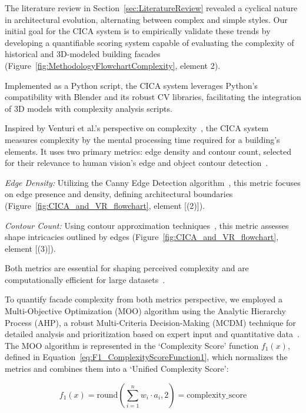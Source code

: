 
The literature review in Section~\ref{sec:LiteratureReview} revealed a cyclical nature in architectural evolution, alternating between complex and simple styles.
Our initial goal for the CICA system is to empirically validate these trends by developing a quantifiable scoring system capable of evaluating the complexity of historical and 3D-modeled building facades (Figure~\ref{fig:MethodologyFlowchartComplexity}, element 2).

Implemented as a Python script, the CICA system leverages Python's compatibility with Blender and its robust CV libraries, facilitating the integration of 3D models with complexity analysis scripts.

Inspired by Venturi et al.'s perspective on complexity~\cite{Venturi1977}, the CICA system measures complexity by the mental processing time required for a building's elements.
It uses two primary metrics: edge density and contour count, selected for their relevance to human vision's edge and object contour detection~\cite{Yang2022}.

\textit{Edge Density:} Utilizing the Canny Edge Detection algorithm~\cite{EdgeOpenCV2023}, this metric focuses on edge presence and density, defining architectural boundaries (Figure~\ref{fig:CICA_and_VR_flowchart}, element [(2)]).

\textit{Contour Count:} Using contour approximation techniques~\cite{ContourOpenCV2023}, this metric assesses shape intricacies outlined by edges (Figure~\ref{fig:CICA_and_VR_flowchart}, element [(3)]).

Both metrics are essential for shaping perceived complexity and are computationally efficient for large datasets~\cite{Yang2022}.

To quantify facade complexity from both metrics perspective, we employed a Multi-Objective Optimization (MOO) algorithm using the Analytic Hierarchy Process (AHP), a robust Multi-Criteria Decision-Making (MCDM) technique for detailed analysis and prioritization based on expert input and quantitative data~\cite{Taherdoost2023}.
The MOO algorithm is represented in the `Complexity Score' function \(f_1(x)\), defined in Equation~\ref{eq:F1_ComplexityScoreFunction1}, which normalizes the metrics and combines them into a `Unified Complexity Score':

\begin{equation}
    f_1(x) = \mathrm{round}\left(\sum_{i=1}^{n} w_i \cdot a_i, 2\right) = \text{complexity\_score}
    \label{eq:F1_ComplexityScoreFunction1}
\end{equation}

